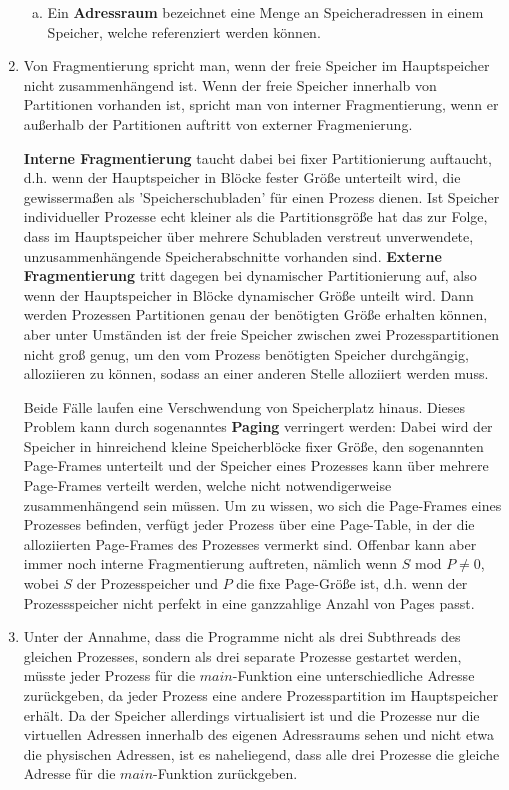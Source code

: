 \documentclass[numbers=noendperiod]{scrartcl}
\begin{document}
\begin{enumerate}[1.]
\begin{enumerate}[a)]
		\item Ein \textbf{Adressraum} bezeichnet eine Menge an Speicheradressen in einem Speicher, welche referenziert werden können.
	\end{enumerate}
	
	\item Von Fragmentierung spricht man, wenn der freie Speicher im Hauptspeicher nicht zusammenhängend ist. Wenn der freie Speicher innerhalb von Partitionen vorhanden ist, spricht man von interner Fragmentierung, wenn er außerhalb der Partitionen auftritt von externer Fragmenierung. 
	
	\textbf{Interne Fragmentierung} taucht dabei bei fixer Partitionierung auftaucht, d.h. wenn der Hauptspeicher in Blöcke fester Größe unterteilt wird, die gewissermaßen als 'Speicherschubladen' für einen Prozess dienen. Ist Speicher individueller Prozesse echt kleiner als die Partitionsgröße hat das zur Folge, dass im Hauptspeicher über mehrere Schubladen verstreut unverwendete, unzusammenhängende Speicherabschnitte vorhanden sind. \textbf{Externe Fragmentierung} tritt dagegen bei dynamischer Partitionierung auf, also wenn der Hauptspeicher in Blöcke dynamischer Größe unteilt wird. Dann werden Prozessen Partitionen genau der benötigten Größe erhalten können, aber unter Umständen ist der freie Speicher zwischen zwei Prozesspartitionen nicht groß genug, um den vom Prozess benötigten Speicher durchgängig, alloziieren zu können, sodass an einer anderen Stelle alloziiert werden muss.
	
	Beide Fälle laufen eine Verschwendung von Speicherplatz hinaus. Dieses Problem kann durch sogenanntes \textbf{Paging} verringert werden: Dabei wird der Speicher in hinreichend kleine Speicherblöcke fixer Größe, den sogenannten Page-Frames unterteilt und der Speicher eines Prozesses kann über mehrere Page-Frames verteilt werden, welche nicht notwendigerweise zusammenhängend sein müssen. Um zu wissen, wo sich die Page-Frames eines Prozesses befinden, verfügt jeder Prozess über eine Page-Table, in der die alloziierten Page-Frames des Prozesses vermerkt sind. Offenbar kann aber immer noch interne Fragmentierung auftreten, nämlich wenn $S \textrm{ mod } P \neq 0$, wobei $S$ der Prozesspeicher und $P$ die fixe Page-Größe ist, d.h. wenn der Prozessspeicher nicht perfekt in eine ganzzahlige Anzahl von Pages passt.
	
	\item Unter der Annahme, dass die Programme nicht als drei Subthreads des gleichen Prozesses, sondern als drei separate Prozesse gestartet werden, müsste jeder Prozess für die $main$-Funktion eine unterschiedliche Adresse zurückgeben, da jeder Prozess eine andere Prozesspartition im Hauptspeicher erhält. Da der Speicher allerdings virtualisiert ist und die Prozesse nur die virtuellen Adressen innerhalb des eigenen Adressraums sehen und nicht etwa die physischen Adressen, ist es naheliegend, dass alle drei Prozesse die gleiche Adresse für die $main$-Funktion zurückgeben.
	
\end{enumerate}
\end{document}
